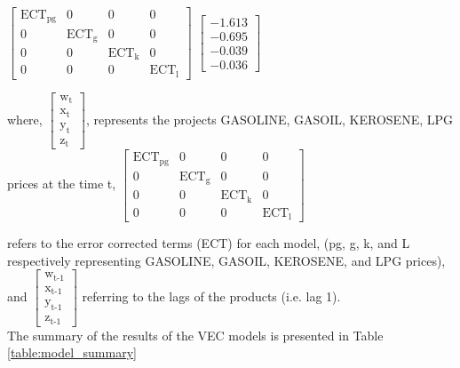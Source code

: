 \documentclass{beamer}
\newcommand{\vspaceFive}{\vspace{5pt}}
\newcommand{\subTT}[2]{\text{#1}_{\text{#2}}}
\newcommand{\varGasoline}{w}
\newcommand{\varGasoil}{x}
\newcommand{\varKerosene}{y}
\newcommand{\varLpg}{z}
\begin{document}
\begin{frame}
			\begin{math}
				\begin{bmatrix}
					\subTT{ECT}{pg} & 0 & 0 & 0 \\
					0 & \subTT{ECT}{g} & 0 & 0 \\
					0 & 0 & \subTT{ECT}{k} & 0 \\
					0 & 0 & 0 & \subTT{ECT}{l}
				\end{bmatrix}
			\end{math}
			\begin{math}
				\begin{bmatrix}
					-1.613 \\
					-0.695 \\
					-0.039 \\
					-0.036
				\end{bmatrix}
			\end{math}	
	
	\end{frame}
	
	\begin{frame}
		where, 
		\begin{math}
			\begin{bmatrix}
				\subTT{\varGasoline}{t} \\
				\subTT{\varGasoil}{t} \\
				\subTT{\varKerosene}{t} \\
				\subTT{\varLpg}{t}
			\end{bmatrix}
		\end{math},
		represents the projects GASOLINE, GASOIL, KEROSENE, LPG prices at the time t,
		\begin{math}
			\begin{bmatrix}
				\subTT{ECT}{pg} & 0 & 0 & 0 \\
				0 & \subTT{ECT}{g} & 0 & 0 \\
				0 & 0 & \subTT{ECT}{k} & 0 \\
				0 & 0 & 0 & \subTT{ECT}{l}
			\end{bmatrix}
		\end{math}
		\vspaceFive
		
		refers to the error corrected terms (ECT) for each model,
		(pg, g, k, and L respectively representing GASOLINE, GASOIL, KEROSENE, and LPG prices), and
		\begin{math}
			\begin{bmatrix}
				\subTT{\varGasoline}{t-1} \\
				\subTT{\varGasoil}{t-1} \\
				\subTT{\varKerosene}{t-1} \\
				\subTT{\varLpg}{t-1}
			\end{bmatrix}
		\end{math} 
		referring to the lags of the products (i.e. lag 1). \\
		\vspaceFive
		The summary of the results of the VEC models is presented in Table \ref{table:model_summary}		
		
	\end{frame}
	
\end{document}
